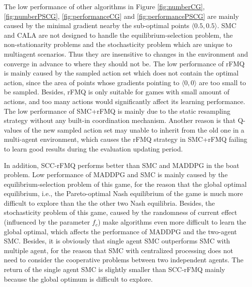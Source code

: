 \documentclass[journal,transmag]{IEEEtran}
\begin{document}
The low performance of other algorithms in Figure \ref{fig:numberCG}, \ref{fig:numberPSCG}, \ref{fig:performanceCG} and \ref{fig:performancePSCG} are mainly caused by the minimal gradient nearby the sub-optimal points $\langle 0.5,0.5\rangle$. SMC and CALA are not designed to handle the equilibrium-selection problem, the non-stationarity problems and the stochasticity problem which are unique to multiagent scenarios. Thus they are insensitive to changes in the environment and converge in advance to where they should not be. The low performance of rFMQ is mainly caused by the sampled action set which does not contain the optimal action, since the area of points whose gradients pointing to $\langle 0,0\rangle$ are too small to be sampled. Besides, rFMQ is only suitable for games with small amount of actions, and too many actions would significantly affect its learning performance. The low performance of SMC+rFMQ is mainly due to the static resampling strategy without any built-in coordination mechanism. Another reason is that Q-values of the new sampled action set may unable to inherit from the old one in a multi-agent environment, which causes the rFMQ strategy in SMC+rFMQ failing to learn good results during the evaluation updating period.

In addition, SCC-rFMQ performs better than SMC and MADDPG in the boat problem. Low performance of MADDPG and SMC is mainly caused by the equilibrium-selection problem of this game, for the reason that the global optimal equilibrium, i.e., the Pareto-optimal Nash equilibrium of the game is much more difficult to explore than the the other two Nash equilibria. Besides, the stochasticity problem of this game, caused by the randomness of current effect (influenced by the parameter $f_c$) make algorithms even more difficult to learn the global optimal, which affects the performance of MADDPG and the two-agent SMC. Besides, it is obviously that single agent SMC outperforms SMC with multiple agent, for the reason that SMC with centralized processing does not need to consider the cooperative problems between two independent agents. The return of the single agent SMC is slightly smaller than SCC-rFMQ mainly because the global optimum is difficult to explore.
\end{document}
